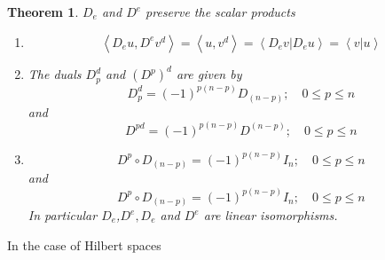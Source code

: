 \documentclass[aps,preprint]{revtex4}%
\newtheorem{theorem}{Theorem}
\begin{document}
\begin{theorem}
$D_{e}$ and $D^{e}$ preserve the scalar products

\begin{enumerate}
\item
\begin{equation}
\left\langle D_{e}u,D^{e}v^{d}\right\rangle =\left\langle u,v^{d}\right\rangle
=\left\langle \left.  D_{e}v\right\vert D_{e}u\right\rangle =\left\langle
\left.  v\right\vert u\right\rangle
\end{equation}


\item The duals $D_{p}^{d}$ and $\left(  D^{p}\right)  ^{d}$ are given by
\begin{equation}
D_{p}^{d}=\left(  -1\right)  ^{p\left(  n-p\right)  }D_{\left(  n-p\right)
};\quad0\leq p\leq n
\end{equation}
and
\begin{equation}
D^{pd}=\left(  -1\right)  ^{p\left(  n-p\right)  }D^{\left(  n-p\right)
};\quad0\leq p\leq n
\end{equation}


\item
\begin{equation}
D^{p}\circ D_{\left(  n-p\right)  }=\left(  -1\right)  ^{p\left(  n-p\right)
}I_{n};\quad0\leq p\leq n
\end{equation}
and
\begin{equation}
D^{p}\circ D_{\left(  n-p\right)  }=\left(  -1\right)  ^{p\left(  n-p\right)
}I_{n};\quad0\leq p\leq n
\end{equation}
In particular $D_{e}$,$D^{e},D_{e}$ and $D^{e}$ are linear isomorphisms.
\end{enumerate}
\end{theorem}

In the case of Hilbert spaces
\end{document}
